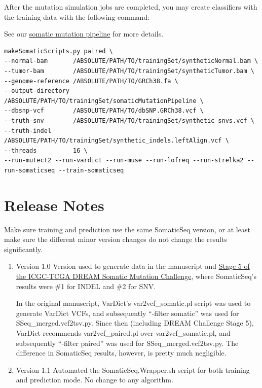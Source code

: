 \documentclass[10pt,letterpaper]{article}
\begin{document}
\begin{sloppypar}
After the mutation simulation jobs are completed, you may create classifiers with the training data with the following command:

See our \href{https://github.com/bioinform/somaticseq/blob/master/utilities/dockered_pipelines}{somatic mutation pipeline} for more details.

\begin{lstlisting}
makeSomaticScripts.py paired \
--normal-bam       /ABSOLUTE/PATH/TO/trainingSet/syntheticNormal.bam \
--tumor-bam        /ABSOLUTE/PATH/TO/trainingSet/syntheticTumor.bam \
--genome-reference /ABSOLUTE/PATH/TO/GRCh38.fa \
--output-directory /ABSOLUTE/PATH/TO/trainingSet/somaticMutationPipeline \
--dbsnp-vcf        /ABSOLUTE/PATH/TO/dbSNP.GRCh38.vcf \
--truth-snv        /ABSOLUTE/PATH/TO/trainingSet/synthetic_snvs.vcf \
--truth-indel      /ABSOLUTE/PATH/TO/trainingSet/synthetic_indels.leftAlign.vcf \
--threads          16 \
--run-mutect2 --run-vardict --run-muse --run-lofreq --run-strelka2 --run-somaticseq --train-somaticseq
\end{lstlisting}





\section{Release Notes}

Make sure training and prediction use the same SomaticSeq version, or at least make sure the different minor version changes do not change the results significantly. 


\begin{enumerate}


    \item Version 1.0
    Version used to generate data in the manuscript and \href{https://www.synapse.org/#!Synapse:syn312572/wiki/72943}{Stage 5 of the ICGC-TCGA DREAM Somatic Mutation Challenge}, where SomaticSeq's results were \#1 for INDEL and \#2 for SNV. 

    In the original manuscript, VarDict's var2vcf\_somatic.pl script was used to generate VarDict VCFs, and subsequently ``-filter somatic'' was used for SSeq\_merged.vcf2tsv.py. Since then (including DREAM Challenge Stage 5), VarDict recommends var2vcf\_paired.pl over var2vcf\_somatic.pl, and subsequently ``-filter paired'' was used for SSeq\_merged.vcf2tsv.py. The difference in SomaticSeq results, however, is pretty much negligible. 

    \item Version 1.1
    Automated the SomaticSeq.Wrapper.sh script for both training and prediction mode. No change to any algorithm. 


\end{enumerate}
\end{sloppypar}
\end{document}
